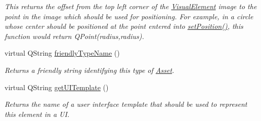 \begin{DoxyCompactItemize}
\begin{DoxyCompactList}\small\item\em This returns the offset from the top left corner of the \hyperlink{struct_picto_1_1_visual_element}{Visual\-Element} image to the point in the image which should be used for positioning. For example, in a circle whose center should be positioned at the point entered into \hyperlink{struct_picto_1_1_visual_element_a454cc96862097e96a0b0f1d2c83e23ed}{set\-Position()}, this function would return Q\-Point(radius,radius). \end{DoxyCompactList}\item 
virtual Q\-String \hyperlink{class_picto_1_1_image_graphic_a3e6f1a40c361657e0fbbd30d25e6a9ae}{friendly\-Type\-Name} ()
\begin{DoxyCompactList}\small\item\em Returns a friendly string identifying this type of \hyperlink{class_picto_1_1_asset}{Asset}. \end{DoxyCompactList}\item 
\hypertarget{class_picto_1_1_image_graphic_a3c82c5ff254afea72d2224f695878ad5}{virtual Q\-String \hyperlink{class_picto_1_1_image_graphic_a3c82c5ff254afea72d2224f695878ad5}{get\-U\-I\-Template} ()}\label{class_picto_1_1_image_graphic_a3c82c5ff254afea72d2224f695878ad5}

\begin{DoxyCompactList}\small\item\em Returns the name of a user interface template that should be used to represent this element in a U\-I. \end{DoxyCompactList}\end{DoxyCompactItemize}
